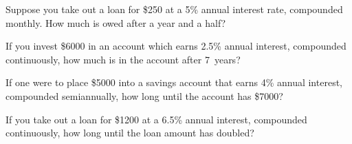 \documentclass[11pt,letterpaper]{article}
\begin{document}

 Suppose you take out a loan for \$250 at a 5\% annual interest rate, compounded monthly. How much is owed after a year and a half?



\newpage



 If you invest \$6000 in an account which earns 2.5\% annual interest, compounded continuously, how much is in the account after 7~years?



\newpage



 If one were to place \$5000 into a savings account that earns 4\% annual interest, compounded semiannually, how long until the account has \$7000?



\newpage



 If you take out a loan for \$1200 at a 6.5\% annual interest, compounded continuously, how long until the loan amount has doubled? 
\end{document}
